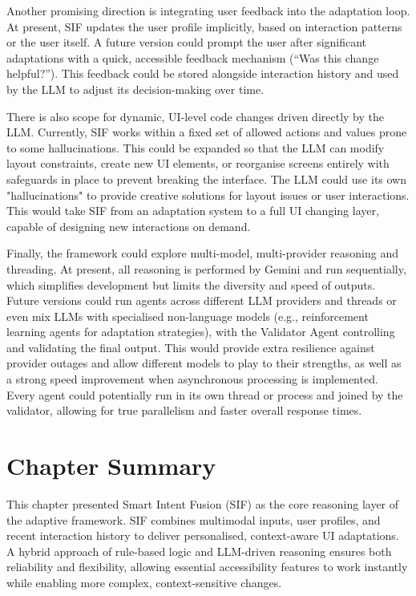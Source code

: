 \documentclass[openany]{book}
\begin{document}
Another promising direction is integrating user feedback into the adaptation loop. At present, SIF updates the user profile implicitly, based on interaction patterns or the user itself. A future version could prompt the user after significant adaptations with a quick, accessible feedback mechanism (“Was this change helpful?”). This feedback could be stored alongside interaction history and used by the LLM to adjust its decision-making over time. 

There is also scope for dynamic, UI-level code changes driven directly by the LLM. Currently, SIF works within a fixed set of allowed actions and values prone to some hallucinations. This could be expanded so that the LLM can modify layout constraints, create new UI elements, or reorganise screens entirely with safeguards in place to prevent breaking the interface. The LLM could use its own "hallucinations" to provide creative solutions for layout issues or user interactions. This would take SIF from an adaptation system to a full UI changing layer, capable of designing new interactions on demand.

Finally, the framework could explore multi-model, multi-provider reasoning and threading. At present, all reasoning is performed by Gemini and run sequentially, which simplifies development but limits the diversity and speed of outputs. Future versions could run agents across different LLM providers and threads or even mix LLMs with specialised non-language models (e.g., reinforcement learning agents for adaptation strategies), with the Validator Agent controlling and validating the final output. This would provide extra resilience against provider outages and allow different models to play to their strengths, as well as a strong speed improvement when asynchronous processing is implemented. Every agent could potentially run in its own thread or process and joined by the validator, allowing for true parallelism and faster overall response times.

\section{Chapter Summary}
This chapter presented Smart Intent Fusion (SIF) as the core reasoning layer of the adaptive framework. SIF combines multimodal inputs, user profiles, and recent interaction history to deliver personalised, context-aware UI adaptations. A hybrid approach of rule-based logic and LLM-driven reasoning ensures both reliability and flexibility, allowing essential accessibility features to work instantly while enabling more complex, context-sensitive changes.
\end{document}
